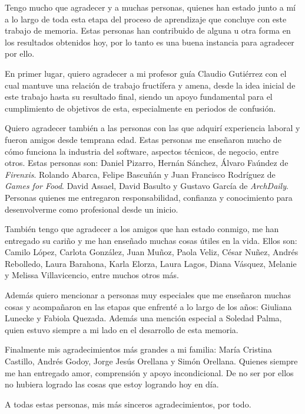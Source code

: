 \begin{thanks}
  Tengo mucho que agradecer y a muchas personas, quienes han estado junto a mí a lo largo de toda esta etapa del proceso de aprendizaje que concluye con este trabajo de memoria. Estas personas han contribuido de alguna u otra forma en los resultados obtenidos hoy, por lo tanto es una buena instancia para agradecer por ello.
  
  En primer lugar, quiero agradecer a mi profesor guía Claudio Gutiérrez con el cual mantuve una relación de trabajo fructífera y amena, desde la idea inicial de este trabajo hasta su resultado final, siendo un apoyo fundamental para el cumplimiento de objetivos de esta, especialmente en periodos de confusión.
  
  Quiero agradecer también a las personas con las que adquirí experiencia laboral y fueron amigos desde temprana edad. Estas personas me enseñaron mucho de cómo funciona la industria del software, aspectos técnicos, de negocio, entre otros. Estas personas son: Daniel Pizarro, Hernán Sánchez, Álvaro Faúndez de \emph{Firenxis}. Rolando Abarca, Felipe Bascuñán y Juan Francisco Rodríguez de \emph{Games for Food}. David Assael, David Basulto y Gustavo García de \emph{ArchDaily}. Personas quienes me entregaron responsabilidad, confianza y conocimiento para desenvolverme como profesional desde un inicio.
  
  También tengo que agradecer a los amigos que han estado conmigo, me han entregado su cariño y me han enseñado muchas cosas útiles en la vida. Ellos son: Camilo López, Carlota González, Juan Muñoz, Paola Veliz, César Nuñez, Andrés Rebolledo, Laura Barahona, Karla Elorza, Laura Lagos, Diana Vásquez, Melanie y Melissa Villavicencio, entre muchos otros más.
  
  Además quiero mencionar a personas muy especiales que me enseñaron muchas cosas y acompañaron en las etapas que enfrenté a lo largo de los años: Giuliana Lunecke y Fabiola Quezada. Además una mención especial a Soledad Palma, quien estuvo siempre a mi lado en el desarrollo de esta memoria.
  
  Finalmente mis agradecimientos más grandes a mi familia: María Cristina Castillo, Andrés Godoy, Jorge Jesús Orellana y Simón Orellana. Quienes siempre me han entregado amor, comprensión y apoyo incondicional. De no ser por ellos no hubiera logrado las cosas que estoy logrando hoy en día.
  
  A todas estas personas, mis más sinceros agradecimientos, por todo.
\end{thanks}